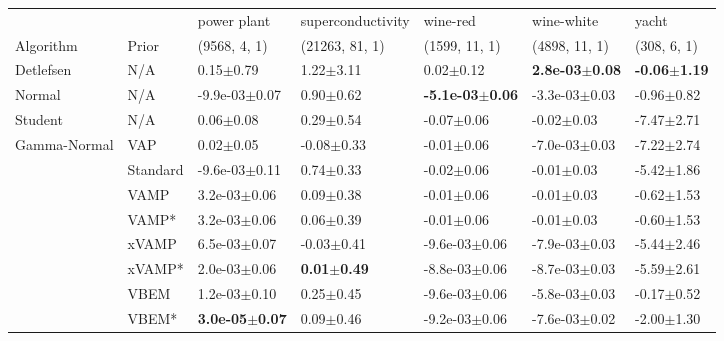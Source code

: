 \begin{tabular}{lllllll}
\midrule
             &       &                power plant &       superconductivity &                    wine-red &                 wine-white &                    yacht \\
Algorithm & Prior& (9568, 4, 1)& (21263, 81, 1)& (1599, 11, 1)& (4898, 11, 1)& (308, 6, 1)\\
\midrule
Detlefsen & N/A &              0.15$\pm$0.79 &           1.22$\pm$3.11 &               0.02$\pm$0.12 &  \textbf{2.8e-03$\pm$0.08} &  \textbf{-0.06$\pm$1.19} \\
Normal & N/A &          -9.9e-03$\pm$0.07 &           0.90$\pm$0.62 &  \textbf{-5.1e-03$\pm$0.06} &          -3.3e-03$\pm$0.03 &           -0.96$\pm$0.82 \\
Student & N/A &              0.06$\pm$0.08 &           0.29$\pm$0.54 &              -0.07$\pm$0.06 &             -0.02$\pm$0.03 &           -7.47$\pm$2.71 \\
Gamma-Normal & VAP &              0.02$\pm$0.05 &          -0.08$\pm$0.33 &              -0.01$\pm$0.06 &          -7.0e-03$\pm$0.03 &           -7.22$\pm$2.74 \\
             & Standard &          -9.6e-03$\pm$0.11 &           0.74$\pm$0.33 &              -0.02$\pm$0.06 &             -0.01$\pm$0.03 &           -5.42$\pm$1.86 \\
             & VAMP &           3.2e-03$\pm$0.06 &           0.09$\pm$0.38 &              -0.01$\pm$0.06 &             -0.01$\pm$0.03 &           -0.62$\pm$1.53 \\
             & VAMP* &           3.2e-03$\pm$0.06 &           0.06$\pm$0.39 &              -0.01$\pm$0.06 &             -0.01$\pm$0.03 &           -0.60$\pm$1.53 \\
             & xVAMP &           6.5e-03$\pm$0.07 &          -0.03$\pm$0.41 &           -9.6e-03$\pm$0.06 &          -7.9e-03$\pm$0.03 &           -5.44$\pm$2.46 \\
             & xVAMP* &           2.0e-03$\pm$0.06 &  \textbf{0.01$\pm$0.49} &           -8.8e-03$\pm$0.06 &          -8.7e-03$\pm$0.03 &           -5.59$\pm$2.61 \\
             & VBEM &           1.2e-03$\pm$0.10 &           0.25$\pm$0.45 &           -9.6e-03$\pm$0.06 &          -5.8e-03$\pm$0.03 &           -0.17$\pm$0.52 \\
             & VBEM* &  \textbf{3.0e-05$\pm$0.07} &           0.09$\pm$0.46 &           -9.2e-03$\pm$0.06 &          -7.6e-03$\pm$0.02 &           -2.00$\pm$1.30 \\
\bottomrule
\end{tabular}


